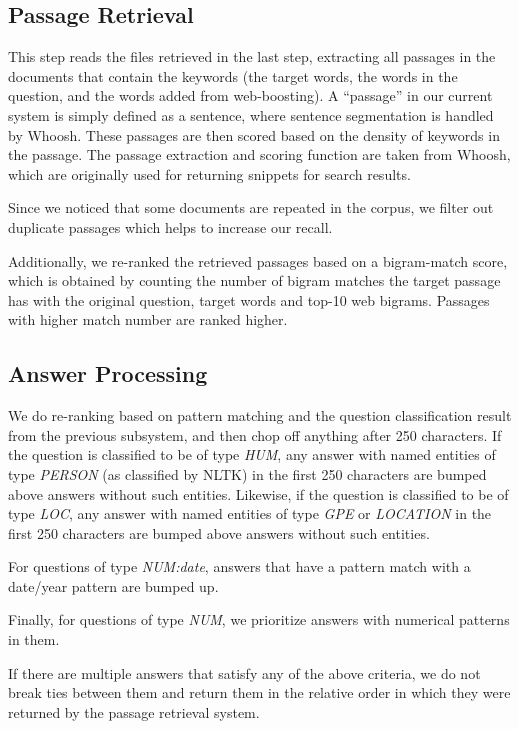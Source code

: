 \documentclass[11pt]{article}
\begin{document}
\subsection{Passage Retrieval}
This step reads the files retrieved in the last step, extracting all passages in the documents that contain the keywords (the target words, the words in the question, and the words added from web-boosting). A ``passage'' in our current system is simply defined as a sentence, where sentence segmentation is handled by Whoosh. These passages are then scored based on the density of keywords in the passage. The passage extraction and scoring function are taken from Whoosh, which are originally used for returning snippets for search results.

Since we noticed that some documents are repeated in the corpus, we filter out duplicate passages which helps to increase our recall.

Additionally, we re-ranked the retrieved passages based on a bigram-match score, which is obtained by counting the number of bigram matches the target passage has with the original question, target words and  top-10 web bigrams. Passages with higher match number are ranked higher.

\subsection{Answer Processing}
We do re-ranking based on pattern matching and the question classification result from the previous subsystem, and then chop off anything after 250 characters. If the question is classified to be of type \emph{HUM}, any answer with named entities of type \emph{PERSON} (as classified by NLTK) in the first 250 characters are bumped above answers without such entities. Likewise, if the question is classified to be of type \emph{LOC}, any answer with named entities of type \emph{GPE} or \emph{LOCATION} in the first 250 characters are bumped above answers without such entities. 

For questions of type \emph{NUM:date}, answers that have a pattern match with a date/year pattern are bumped up. 

Finally, for questions of type \emph{NUM}, we prioritize answers with numerical patterns in them. 

If there are multiple answers that satisfy any of the above criteria, we do not break ties between them and return them in the relative order in which they were returned by the passage retrieval system.
\end{document}
